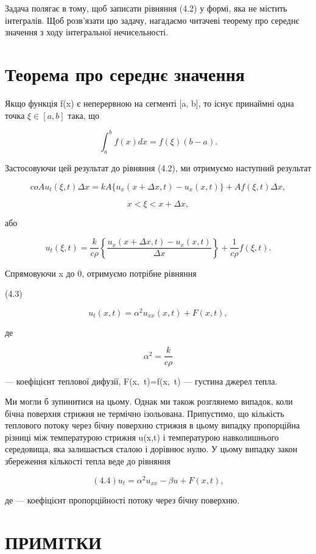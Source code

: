 \documentclass[
  ukrainian,
]{article}
\begin{document}
Задача полягає в тому, щоб записати рівняння (4.2) у формі, яка не
містить інтегралів. Щоб розв'язати цю задачу, нагадаємо читачеві теорему
про середнє значення з ходу інтегральної нечисельності.

\section{Теорема про середнє
значення}\label{ux442ux435ux43eux440ux435ux43cux430-ux43fux440ux43e-ux441ux435ux440ux435ux434ux43dux454-ux437ux43dux430ux447ux435ux43dux43dux44f}

Якщо функція f(x) є неперервною на сегменті {[}a, b{]}, то існує
принаймні одна точка \(\xi \in [a, b]\) така, що

\[
\int_{a}^{b} f(x) dx = f(\xi) (b-a).
\]

Застосовуючи цей результат до рівняння (4.2), ми отримуємо наступний
результат

\[
coAu_{t}(\xi, t) \Delta x = kA\{u_{x}(x + \Delta x, t) - u_{x}(x, t)\} + Af(\xi, t) \Delta x,
\]

\[
x < \xi < x + \Delta x,
\]

або

\[
u_t(\xi, t) = \frac{k}{c\rho} \left\{ \frac{u_x(x + \Delta x, t) - u_x(x, t)}{\Delta x} \right\} + \frac{1}{c\rho} f(\xi, t).
\]

Спрямовуючи \Delta x до 0, отримуємо потрібне рівняння

(4.3)

\[
u_t(x, t) = \alpha^2 u_{xx}(x, t) + F(x, t),
\]

де

\[
\alpha^{2}=\frac{k}{c\rho}
\]

--- коефіцієнт теплової дифузії,
F\left(x,~t\right)=f\left(x,~t\right) --- густина джерел
тепла.

Ми могли б зупинитися на цьому. Однак ми також розглянемо випадок, коли
бічна поверхня стрижня не термічно ізольована. Припустимо, що кількість
теплового потоку через бічну поверхню стрижня в цьому випадку
пропорційна різниці між температурою стрижня u(x,t) і температурою
навколишнього середовища, яка залишається сталою і дорівнює нулю. У
цьому випадку закон збереження кількості тепла веде до рівняння

\[
(4.4) u_t = \alpha^2 u_{xx} - \beta u + F(x, t),
\]

де \beta --- коефіцієнт пропорційності потоку через бічну поверхню.

\section{ПРИМІТКИ}\label{ux43fux440ux438ux43cux456ux442ux43aux438}
\end{document}
